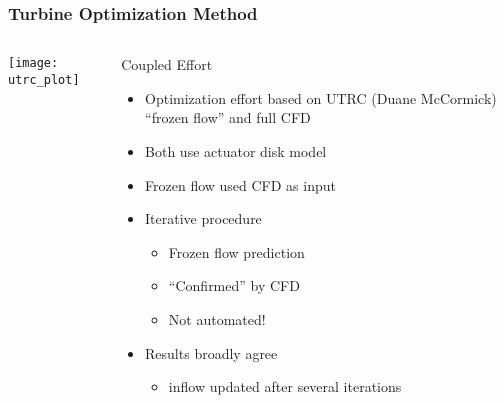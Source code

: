 \documentclass[mathserif]{beamer}
\begin{document}
%
%
\begin{frame}
 \frametitle{Turbine Optimization Method}

 \begin{columns}[]
  \begin{column}{0.45\linewidth}
   \begin{center}
    \texttt{[image: utrc\_plot]}
   \end{center}

  \end{column}
    \begin{column}{0.55\linewidth}

     \begin{block}{Coupled Effort}
     \begin{itemize}
      \item Optimization effort based on UTRC (Duane McCormick) ``frozen flow'' 
	    and full CFD
      \item Both use actuator disk model
      \item Frozen flow used CFD as input
      \item Iterative procedure
	    \begin{itemize}
	     \item Frozen flow prediction 
	     \item ``Confirmed'' by CFD
	     \item Not automated!
	    \end{itemize}
      \item Results broadly agree
	    \begin{itemize}
	     \item inflow updated after several iterations
	    \end{itemize}
     \end{itemize}

      \end{block}
    \end{column}
 \end{columns}
\end{frame}
\end{document}

